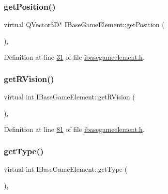 \subsubsection{\texorpdfstring{get\+Position()}{getPosition()}}
{\footnotesize\ttfamily virtual Q\+Vector3D$\ast$ I\+Base\+Game\+Element\+::get\+Position (\begin{DoxyParamCaption}{ }\end{DoxyParamCaption})\hspace{0.3cm}{\ttfamily [inline]}, {\ttfamily [virtual]}}



Definition at line \hyperlink{a00047_source_l00031}{31} of file \hyperlink{a00047_source}{ibasegameelement.\+h}.

\mbox{\label{a00137_a4437ee7dcdb6e3e3c58c8b00d8bb0500}} 
\subsubsection{\texorpdfstring{get\+R\+Vision()}{getRVision()}}
{\footnotesize\ttfamily virtual int I\+Base\+Game\+Element\+::get\+R\+Vision (\begin{DoxyParamCaption}{ }\end{DoxyParamCaption})\hspace{0.3cm}{\ttfamily [inline]}, {\ttfamily [virtual]}}



Definition at line \hyperlink{a00047_source_l00081}{81} of file \hyperlink{a00047_source}{ibasegameelement.\+h}.

\mbox{\label{a00137_a639bd1e233821ff606bb8fe2931f6ee7}} 
\subsubsection{\texorpdfstring{get\+Type()}{getType()}}
{\footnotesize\ttfamily virtual int I\+Base\+Game\+Element\+::get\+Type (\begin{DoxyParamCaption}{ }\end{DoxyParamCaption})\hspace{0.3cm}{\ttfamily [inline]}, {\ttfamily [virtual]}}



